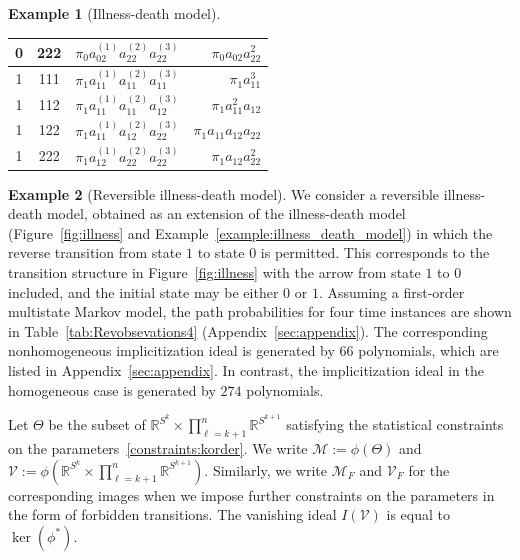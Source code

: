 \documentclass[11pt, a4paper]{article}
\numberwithin{equation}{section}
\theoremstyle{plain}
\theoremstyle{definition}
\newtheorem{example}{Example}
\begin{document}
\begin{example}[Illness-death model]
{\begin{table}[!ht]
\begin{tabular}{c|c|c|r}
        0 & 222  & $\pi_0a_{02}^{(1)} a_{22}^{(2)} a_{22}^{(3)}$ & $\pi_0a_{02} a_{22}^2$\\      
        \hline
        1 & 111 & $\pi_1a_{11}^{(1)} a_{11}^{(2)} a_{11}^{(3)}$ & $\pi_1a_{11}^3$ \\
        1 & 112 & $\pi_1a_{11}^{(1)} a_{11}^{(2)} a_{12}^{(3)}$ & $\pi_1a_{11}^2 a_{12}$ \\
        1 & 122  & $\pi_1a_{11}^{(1)} a_{12}^{(2)} a_{22}^{(3)}$ & $\pi_1a_{11} a_{12} a_{22}$ \\
        1 & 222  & $\pi_1a_{12}^{(1)} a_{22}^{(2)} a_{22}^{(3)}$ & $\pi_1a_{12} a_{22}^2$ \\
        \hline        
    \end{tabular}
\end{table}
}
\end{example}
\begin{example}[{Reversible illness-death model}]
\label{example:revillness_death_model}
We consider a reversible illness-death model, obtained as an extension of the illness-death model
(Figure~\ref{fig:illness} and Example~\ref{example:illness_death_model}) in which the reverse
transition from state $1$ to state $0$ is permitted. This corresponds to the transition structure in
Figure~\ref{fig:illness} with the arrow from state $1$ to $0$ included, and the initial state may be
either $0$ or $1$.
Assuming a first-order multistate Markov model, the path probabilities for four time instances are
shown in Table~\ref{tab:Revobsevations4} (Appendix~\ref{sec:appendix}). The corresponding
nonhomogeneous implicitization ideal is generated by $66$ polynomials, which are listed in
Appendix~\ref{sec:appendix}. In contrast, the implicitization ideal in the homogeneous case is
generated by $274$ polynomials.
\end{example}





Let $\Theta$ be the subset of $\textstyle{\mathbb{R}^{S^k} \times \prod_{\ell=k+1}^n \mathbb{R}^{S^{k+1}}}$ 
satisfying the statistical constraints on the parameters~\eqref{constraints:korder}.  We write $\mathcal{M}:= \phi \left( \Theta \right)$ and $\mathcal{V}:=\phi \left(\textstyle{\mathbb{R}^{S^k} \times \prod_{\ell=k+1}^n \mathbb{R}^{S^{k+1}}}
\right)$. Similarly, we write $\mathcal{M}_F$ and $\mathcal{V}_F$ for the corresponding images when we impose further constraints on the parameters in the form of forbidden transitions.  The vanishing ideal $I(\mathcal{V})$ is equal to $\ker(\phi^*)$. 
\end{document}
